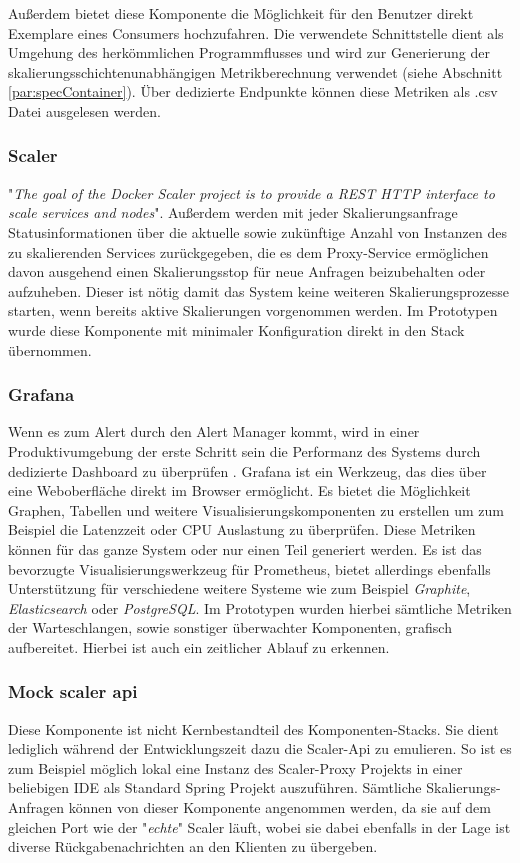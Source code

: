 Außerdem bietet diese Komponente die Möglichkeit für den Benutzer direkt Exemplare eines Consumers hochzufahren. Die verwendete Schnittstelle dient als Umgehung des herkömmlichen Programmflusses und wird zur Generierung der skalierungsschichtenunabhängigen Metrikberechnung verwendet (siehe Abschnitt \ref{par:specContainer}). Über dedizierte Endpunkte können diese Metriken als .csv Datei ausgelesen werden. 


\subsubsection{Scaler \checkmark}
"\emph{The goal of the Docker Scaler project is to provide a REST HTTP interface to scale services and nodes}"\cite{docker-scaler}. Außerdem werden mit jeder Skalierungsanfrage Statusinformationen über die aktuelle sowie zukünftige Anzahl von Instanzen des zu skalierenden Services zurückgegeben, die es dem Proxy-Service ermöglichen davon ausgehend einen Skalierungsstop für neue Anfragen beizubehalten oder aufzuheben. Dieser ist nötig damit das System keine weiteren Skalierungsprozesse starten, wenn bereits aktive Skalierungen vorgenommen werden. Im Prototypen wurde diese Komponente mit minimaler Konfiguration direkt in den Stack übernommen.


\subsubsection{Grafana \checkmark}
Wenn es zum Alert durch den Alert Manager kommt, wird in einer Produktivumgebung der erste Schritt sein die Performanz des Systems durch dedizierte Dashboard zu überprüfen \cite[Seite~97]{oreillyPrometheus}. Grafana ist ein Werkzeug, das dies über eine Weboberfläche direkt im Browser ermöglicht. Es bietet die Möglichkeit Graphen, Tabellen und weitere Visualisierungskomponenten zu erstellen um zum Beispiel die Latenzzeit oder CPU Auslastung zu überprüfen. Diese Metriken können für das ganze System oder nur einen Teil generiert werden. Es ist das bevorzugte Visualisierungswerkzeug für Prometheus, bietet allerdings ebenfalls Unterstützung für verschiedene weitere Systeme wie zum Beispiel \emph{Graphite}, \emph{Elasticsearch} oder \emph{PostgreSQL}. Im Prototypen wurden hierbei sämtliche Metriken der Warteschlangen, sowie sonstiger überwachter Komponenten, grafisch aufbereitet. Hierbei ist auch ein zeitlicher Ablauf zu erkennen.


\subsubsection{Mock scaler api \checkmark}
Diese Komponente ist nicht Kernbestandteil des Komponenten-Stacks. Sie dient lediglich während der Entwicklungszeit dazu die Scaler-Api zu emulieren. So ist es zum Beispiel möglich lokal eine Instanz des Scaler-Proxy Projekts in einer beliebigen IDE als Standard Spring Projekt auszuführen. Sämtliche Skalierungs-Anfragen können von dieser Komponente angenommen werden, da sie auf dem gleichen Port wie der "\emph{echte}" Scaler läuft, wobei sie dabei ebenfalls in der Lage ist diverse Rückgabenachrichten an den Klienten zu übergeben.




